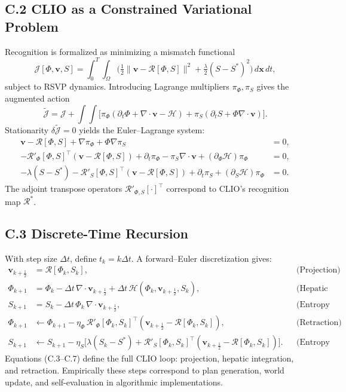 \documentclass[11pt]{article}
\begin{document}
\subsection*{C.2 CLIO as a Constrained Variational Problem}
Recognition is formalized as minimizing a mismatch functional
\[
\mathcal{J}[\Phi,\mathbf{v},S]
 = \!\int_0^T\!\!\!\int_{\Omega}
   \Big(
     \tfrac{1}{2}\|\mathbf{v}-\mathcal{R}[\Phi,S]\|^2
     + \tfrac{\lambda}{2}(S-S^\ast)^2
   \Big)\,d\mathbf{x}\,dt,
\]
subject to RSVP dynamics.
Introducing Lagrange multipliers $\pi_\Phi,\pi_S$ gives the augmented action
\[
\widetilde{\mathcal{J}}
 = \mathcal{J}
 + \!\int\!\!\int\!
   \big[
   \pi_\Phi(\partial_t\Phi+\nabla\!\cdot\!\mathbf{v}-\mathcal{H})
   +\pi_S(\partial_tS+\Phi\nabla\!\cdot\!\mathbf{v})
   \big].
\]
Stationarity $\delta\widetilde{\mathcal{J}}=0$ yields the Euler–Lagrange
system:
\begin{align}
\mathbf{v} - \mathcal{R}[\Phi,S] + \nabla\pi_\Phi + \Phi\nabla\pi_S &= 0, \\
-\mathcal{R}'_\Phi[\Phi,S]^{\!\top}(\mathbf{v}-\mathcal{R}[\Phi,S])
 + \partial_t\pi_\Phi - \pi_S\nabla\!\cdot\!\mathbf{v}
 + (\partial_{\Phi}\mathcal{H})\pi_\Phi &= 0, \\
-\lambda(S-S^\ast)
 - \mathcal{R}'_S[\Phi,S]^{\!\top}(\mathbf{v}-\mathcal{R}[\Phi,S])
 + \partial_t\pi_S + (\partial_{S}\mathcal{H})\pi_\Phi &= 0.
\end{align}
The adjoint transpose operators
$\mathcal{R}'_{\Phi,S}[\cdot]^{\top}$ correspond to CLIO’s
recognition map $\mathcal{R}^\ast$.

\subsection*{C.3 Discrete-Time Recursion}
With step size $\Delta t$, define $t_k=k\Delta t$.
A forward–Euler discretization gives:
\begin{align}
\mathbf{v}_{k+\frac12} &= \mathcal{R}[\Phi_k,S_k], 
  &&\text{(Projection)}\\
\Phi_{k+1} &= \Phi_k - \Delta t\,\nabla\!\cdot\!\mathbf{v}_{k+\frac12}
 + \Delta t\,\mathcal{H}(\Phi_k,\mathbf{v}_{k+\frac12},S_k),
  &&\text{(Hepatic step)}\\
S_{k+1} &= S_k - \Delta t\,\Phi_k\,\nabla\!\cdot\!\mathbf{v}_{k+\frac12},
  &&\text{(Entropy update)}\\
\Phi_{k+1} &\leftarrow \Phi_{k+1}
 - \eta_\Phi\,\mathcal{R}'_\Phi[\Phi_k,S_k]^{\!\top}
   (\mathbf{v}_{k+\frac12}-\mathcal{R}[\Phi_k,S_k]),
  &&\text{(Retraction)}\\
S_{k+1} &\leftarrow S_{k+1}
 - \eta_S\big[
   \lambda(S_k-S^\ast)
   +\mathcal{R}'_S[\Phi_k,S_k]^{\!\top}
   (\mathbf{v}_{k+\frac12}-\mathcal{R}[\Phi_k,S_k])
   \big].
  &&\text{(Entropy correction)}
\end{align}
Equations (C.3–C.7) define the full CLIO loop: 
projection, hepatic integration, and retraction.
Empirically these steps correspond to plan generation, world update,
and self-evaluation in algorithmic implementations.
\end{document}
